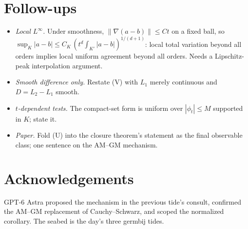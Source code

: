\documentclass[11pt]{article}
\begin{document}
\section{Follow-ups}

\begin{itemize}
\item \emph{Local $L^\infty$.} Under smoothness, $\|\nabla(a - b)\| \le
Ct$ on a fixed ball, so $\sup_K|a - b| \le C_K\,(t^d\int_{K'}|a -
b|)^{1/(d+1)}$: local total variation beyond all orders implies local
uniform agreement beyond all orders. Needs a Lipschitz-peak
interpolation argument.
\item \emph{Smooth difference only.} Restate (V) with $L_1$ merely
continuous and $D = L_2 - L_1$ smooth.
\item \emph{$t$-dependent tests.} The compact-set form is uniform over
$|\phi_t| \le M$ supported in $K$; state it.
\item \emph{Paper.} Fold (U) into the closure theorem's statement as the
final observable class; one sentence on the AM--GM mechanism.
\end{itemize}

\section*{Acknowledgements}

GPT-6 Astra proposed the mechanism in the previous tide's consult,
confirmed the AM--GM replacement of Cauchy--Schwarz, and scoped the
normalized corollary. The seabed is the day's three germbij tides.
\end{document}
